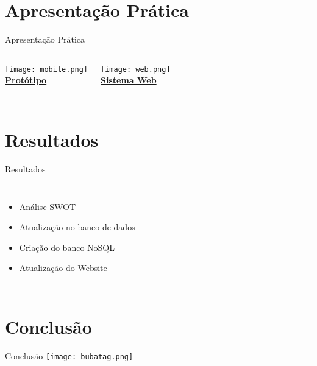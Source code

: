 \documentclass[10pt]{beamer}
\begin{document}
\section{Apresentação Prática}
\begin{frame}{Apresentação Prática}
\centering

\begin{columns}[T,onlytextwidth]
    \centering
    \texttt{[image: mobile.png]}\\[0.3cm]
    {\Large\textbf{\underline{Protótipo}}}

    \centering
    \texttt{[image: web.png]}\\[0.3cm]
    {\Large\textbf{\underline{Sistema Web}}}
\end{columns}

\vspace{0.4cm}
\begin{center}
    \textcolor{verdeBuba}{\rule{0.9\linewidth}{1.8pt}}
\end{center}

\end{frame}

\section{Resultados}
\begin{frame}{Resultados}

\begin{columns}[T,onlytextwidth]

    \begin{itemize}
        \setlength{\itemsep}{12pt} %
        \item Análise SWOT
        \item Atualização no banco de dados
        \item Criação do banco NoSQL
        \item Atualização do Website
    \end{itemize}

    \centering
\end{columns}

\end{frame}
\section{Conclusão}
\begin{frame}{Conclusão}
    \centering
    \texttt{[image: bubatag.png]}
\end{frame}
\end{document}
